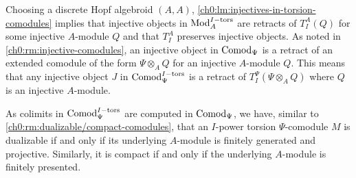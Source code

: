 \begin{remark}
    \label{ch0:rm:injectives-in-torsion-modules}
    Choosing a discrete Hopf algebroid $(A,A)$, \cref{ch0:lm:injectives-in-torsion-comodules} implies that injective objects in $\mathrm{Mod}_A^{I-\mathrm{tors}}$ are retracts of $T_I^A(Q)$ for some injective $A$-module $Q$ and that $T_I^A$ preserves injective objects. As noted in \cref{ch0:rm:injective-comodules}, an injective object in $\mathrm{Comod}_\Psi$ is a retract of an extended comodule of the form $\Psi\otimes_A Q$ for an injective $A$-module $Q$. This means that any injective object $J$ in $\mathrm{Comod}_\Psi^{I-\mathrm{tors}}$ is a retract of $T_I^\Psi(\Psi\otimes_A Q)$ where $Q$ is an injective $A$-module. 
\end{remark}

\begin{remark}
    \label{ch0:rm:dualizable/compact-torsion-comodule}
    As colimits in $\mathrm{Comod}_\Psi^{I-\mathrm{tors}}$ are computed in $\mathrm{Comod}_\Psi$, we have, similar to \cref{ch0:rm:dualizable/compact-comodules}, that an $I$-power torsion $\Psi$-comodule $M$ is dualizable if and only if its underlying $A$-module is finitely generated and projective. Similarly, it is compact if and only if the underlying $A$-module is finitely presented. 
\end{remark}



